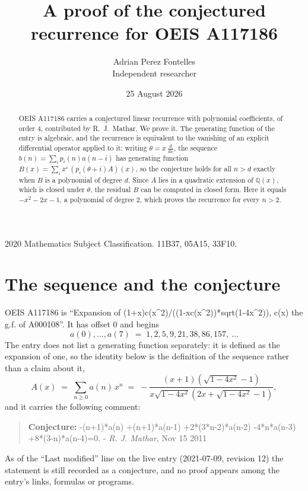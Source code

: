 \documentclass[11pt,a4paper]{article}
\title{A proof of the conjectured recurrence for OEIS A117186}
\author{Adrian Perez Fontelles\\ \small Independent researcher}
\date{25 August 2026}
\theoremstyle{plain}
\theoremstyle{definition}
\begin{document}
\maketitle

\begin{abstract}
OEIS A117186 carries a conjectured linear recurrence with polynomial coefficients, of
order 4, contributed by R.~J.~Mathar. We prove it. The generating function of the
entry is algebraic, and the recurrence is equivalent to the vanishing of an explicit
differential operator applied to it: writing $\theta=x\,\frac{d}{dx}$, the sequence
$b(n)=\sum_{i}p_{i}(n)a(n-i)$ has generating function
$B(x)=\sum_{i}x^{i}\,(p_{i}(\theta+i)A)(x)$, so the conjecture holds for all $n>d$ exactly
when $B$ is a polynomial of degree $d$. Since $A$ lies in a quadratic extension of
$\mathbb{Q}(x)$, which is closed under $\theta$, the residual $B$ can be computed in
closed form. Here it equals $- x^{2} - 2 x - 1$, a polynomial of degree $2$, which proves
the recurrence for every $n>2$.
\end{abstract}

\noindent\small 2020 Mathematics Subject Classification. 11B37, 05A15, 33F10.\normalsize

\section{The sequence and the conjecture}

OEIS A117186 is ``Expansion of (1+x)c(x\textasciicircum{}2)/((1-xc(x\textasciicircum{}2))*sqrt(1-4x\textasciicircum{}2)), c(x) the g.f. of A000108''. It has offset $0$ and begins
\[
a(0),\dots,a(7)\;=\;1, 2, 5, 9, 21, 38, 86, 157,\ \dots
\]
The entry does not list a generating function separately: it is defined as the
expansion of one, so the identity below is the definition of the sequence rather than a
claim about it,
\begin{equation}\label{eq:gf}
A(x)\;=\;\sum_{n\ge 0} a(n)\,x^{n}\;=\;- \frac{\left(x + 1\right) \left(\sqrt{1 - 4 x^{2}} - 1\right)}{x \sqrt{1 - 4 x^{2}} \left(2 x + \sqrt{1 - 4 x^{2}} - 1\right)} ,
\end{equation}
and it carries the following comment:
\begin{quote}\small
\textbf{Conjecture:} -(n+1)*a(n) +(n+1)*a(n-1) +2*(3*n-2)*a(n-2) -4*n*a(n-3) +8*(3-n)*a(n-4)=0. - \emph{R. J. Mathar}, Nov 15 2011
\end{quote}
As of the ``Last modified'' line on the live entry (2021-07-09, revision 12) the
statement is still recorded as a conjecture, and no proof appears among the entry's links,
formulas or programs.
\end{document}
